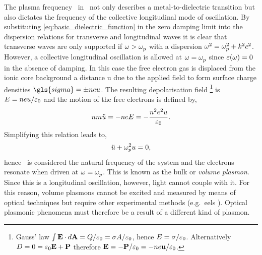 \documentclass{article}
\begin{document}

The plasma frequency \omegap\ in \dielectric\ not only describes a metal-to-dielectric transition but also dictates the frequency of the collective longitudinal mode of oscillation. By substituting \eqref{eq:basic_dielectric_function} in the zero damping limit into the dispersion relations for transverse and longitudinal waves it is clear that transverse waves are only supported if $\omega>\omegap$ with a dispersion $\omega^2=\omegap[2]+\wvm^2c^2$. However, a collective longitudinal oscillation is allowed at $\omega=\omegap$ since $\dielectric=0$ in the absence of damping. In this case the free electron gas is displaced from the ionic core background a distance \gls{u} due to the applied field to form surface charge densities $\gls{sigma} = \pm neu$. The resulting depolarisation field%
\footnote{Gauss' law $\int \vec{E}\cdot d\vec{A} = Q/\epsfs=\sigma A/\epsfs$, hence $E=\sigma/\epsfs$. Alternatively $D=0=\epsfs\vec{E}+\vec{P}$ therefore $\vec{E}=-\vec{P}/\epsfs=-ne\vec{u}/\epsfs$.}
is $E = neu/\epsfs$ and the motion of the free electrons is defined by,
\begin{equation}
	nm\ddot{u} = -neE = -\frac{n^2e^2u}{\epsfs}.
\end{equation}
Simplifying this relation leads to,
\begin{equation}
	\ddot{u}+\omegap[2] u=0,
\end{equation}
hence \omegap\ is considered the natural frequency of the system and the electrons resonate when driven at $\omega=\omegap$. This is known as the bulk or \emph{volume plasmon}. Since this is a longitudinal oscillation, however, light cannot couple with it. For this reason, volume plasmons cannot be excited and measured by means of optical techniques but require other experimental methods (e.g.\ \gls{eels} \cite{egerton2011electron}). Optical plasmonic phenomena must therefore be a result of a different kind of plasmon.
\end{document}
